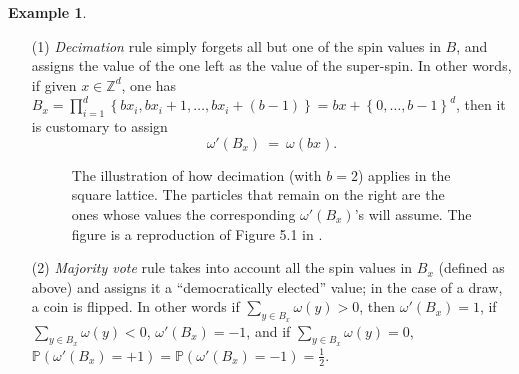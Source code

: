 \documentclass[12pt]{article}
\renewcommand{\P}{\mathbb{P}}
\newcommand{\Z}{\mathbb{Z}}
\newcommand{\set}[1]{\left\{#1\right\}}
\newcommand{\1}{\mathbbm{1}}
\newcommand{\5}{\vspace{0.5cm}}
\theoremstyle{definition}
\newtheorem{ex}[thm]{Example}
\begin{document}
\begin{ex}\label{RG:example}
~
\begin{itemize}
	\item[(1)] \textit{Decimation} rule simply forgets all but one of the spin values in $B$, and assigns the value of the one left as the value of the super-spin. In other words, if given $x\in\Z^d$, one has $B_x=\prod_{i=1}^d \set{b x_i,b x_i+1,\ldots,b x_i+(b-1)}=bx+\set{0,\ldots,b-1}^d$, then it is customary to assign
	$$\omega'(B_x) ~=~ \omega(bx).$$
\vspace{-0.9cm}
\begin{figure}[h!]
\centering
{}
\caption{The illustration of how decimation (with $b=2$) applies in the square lattice. The particles that remain on the right are the ones whose values the corresponding $\omega'(B_x)$'s will assume. The figure is a reproduction of Figure 5.1 in \cite{Ber}.}
\end{figure}
\vspace{-0.5cm}
	\item[(2)] \textit{Majority vote} rule takes into account all the spin values in $B_x$ (defined as above) and assigns it a ``democratically elected'' value; in the case of a draw, a coin is flipped. In other words if $\sum_{y\in B_x}\omega(y)>0$, then $\omega'(B_x)=1$, if $\sum_{y\in B_x}\omega(y)<0$, $\omega'(B_x)=-1$, and if $\sum_{y\in B_x}\omega(y)=0$, $\P(\omega'(B_x)=+1)=\P(\omega'(B_x)=-1)=\frac{1}{2}$.
\end{itemize}
\end{ex}
\end{document}
